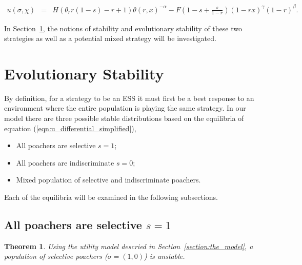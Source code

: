 \documentclass[10pt]{article}
\newtheorem{theorem}{Theorem}
\begin{document}
\begin{eqnarray}
\label{eqn:tutility2}
u(\sigma, \chi) &=&
H (\theta_r r(1-s) - r + 1)\theta(r,x)^{-\alpha} - F\left(1-s + \frac{s}{1-r} \right)(1-rx)^{\gamma}(1-r)^{\beta} .
\end{eqnarray}

In Section~\ref{section:evolutionary_stability}, the notions of stability
and evolutionary stability of these two strategies as well as a potential 
mixed strategy will be investigated.

\section{Evolutionary Stability}\label{section:evolutionary_stability}

By definition, for a strategy to be an ESS it must first be a best response to an 
environment where the entire population is playing the same strategy.
In our model there are three possible stable distributions based on the
equilibria of equation (\ref{eqn:u_differential_simplified}),

\begin{itemize} 
    \item All poachers are selective \(s=1\);
    \item All poachers are indiscriminate \(s=0\);
    \item Mixed population of selective and indiscriminate poachers.
\end{itemize}

Each of the equilibria will be examined in the following subsections.

\subsection{All poachers are selective \(s=1\)}

\begin{theorem}
Using the utility model descried in Section~\ref{section:the_model}, 
a population of selective poachers (\(\sigma=(1, 0)\)) is unstable.
\end{theorem}
\end{document}
